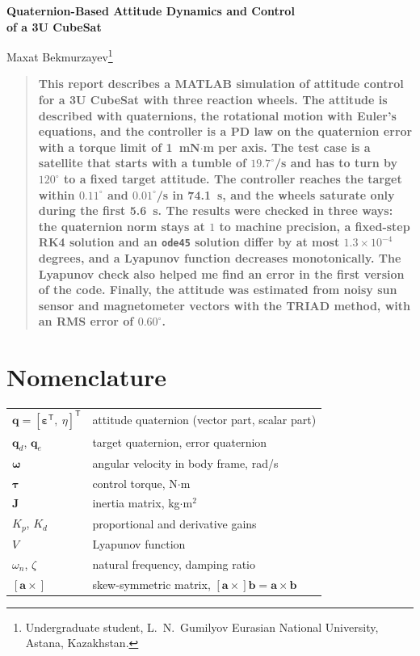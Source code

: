 \documentclass[letterpaper,10pt]{article}
\newcommand{\vv}[1]{\bm{#1}}
\newcommand{\Tp}{^{\mathsf{T}}}
\begin{document}
\begin{center}
{\LARGE\bfseries Quaternion-Based Attitude Dynamics and Control\\[2pt]
of a 3U CubeSat\par}
\vspace{12pt}
{\large Maxat Bekmurzayev\footnote{Undergraduate student, L.~N.~Gumilyov Eurasian National University, Astana, Kazakhstan.}\par}
\end{center}

\vspace{6pt}
\begin{quote}
\bfseries
This report describes a MATLAB simulation of attitude control for a 3U
CubeSat with three reaction wheels. The attitude is described with
quaternions, the rotational motion with Euler's equations, and the controller
is a PD law on the quaternion error with a torque limit of 1~mN$\cdot$m per
axis. The test case is a satellite that starts with a tumble of
$19.7^\circ$/s and has to turn by $120^\circ$ to a fixed target attitude. The
controller reaches the target within $0.11^\circ$ and $0.01^\circ$/s in
74.1~s, and the wheels saturate only during the first 5.6~s. The results were
checked in three ways: the quaternion norm stays at $1$ to machine precision,
a fixed-step RK4 solution and an \texttt{ode45} solution differ by at most
$1.3\times10^{-4}$ degrees, and a Lyapunov function decreases monotonically.
The Lyapunov check also helped me find an error in the first version of the
code. Finally, the attitude was estimated from noisy sun sensor and
magnetometer vectors with the TRIAD method, with an RMS error of $0.60^\circ$.
\end{quote}

\section*{Nomenclature}
\begin{tabular}{@{}l@{\hspace{1.2em}=\hspace{1.2em}}l@{}}
$\vv{q} = [\vv{\varepsilon}\Tp,\ \eta]\Tp$ & attitude quaternion (vector part, scalar part) \\
$\vv{q}_d$, $\vv{q}_e$ & target quaternion, error quaternion \\
$\vv{\omega}$ & angular velocity in body frame, rad/s \\
$\vv{\tau}$ & control torque, N$\cdot$m \\
$\vv{J}$ & inertia matrix, kg$\cdot$m$^2$ \\
$K_p$, $K_d$ & proportional and derivative gains \\
$V$ & Lyapunov function \\
$\omega_n$, $\zeta$ & natural frequency, damping ratio \\
$[\vv{a}\times]$ & skew-symmetric matrix, $[\vv{a}\times]\vv{b} = \vv{a}\times\vv{b}$ \\
\end{tabular}
\end{document}
